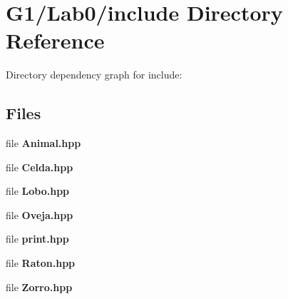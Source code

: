 \section{G1/\+Lab0/include Directory Reference}
\label{dir_447a4ec4d3f3f13b623727dac6ca32ee}
Directory dependency graph for include\+:
\subsection*{Files}
\begin{DoxyCompactItemize}
\item 
file {\bf Animal.\+hpp}
\item 
file {\bf Celda.\+hpp}
\item 
file {\bf Lobo.\+hpp}
\item 
file {\bf Oveja.\+hpp}
\item 
file {\bf print.\+hpp}
\item 
file {\bf Raton.\+hpp}
\item 
file {\bf Zorro.\+hpp}
\end{DoxyCompactItemize}
